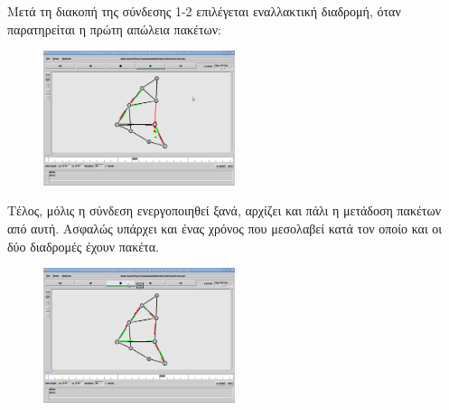 \documentclass[a4paper,9pt]{article}
\begin{document}
Μετά τη διακοπή της σύνδεσης 1-2 επιλέγεται εναλλακτική διαδρομή, όταν
παρατηρείται η πρώτη απώλεια πακέτων:

\begin{figure}[h]
	\centering
	\includegraphics[width=0.5\textwidth]{files/5.png}
\end{figure}

Τέλος, μόλις η σύνδεση ενεργοποιηθεί ξανά, αρχίζει και πάλι η μετάδοση πακέτων
από αυτή. Ασφαλώς υπάρχει και ένας χρόνος που μεσολαβεί κατά τον οποίο και οι
δύο διαδρομές έχουν πακέτα.

\begin{figure}[h]
	\centering
	\includegraphics[width=0.5\textwidth]{files/6.png}
\end{figure}
\end{document}

